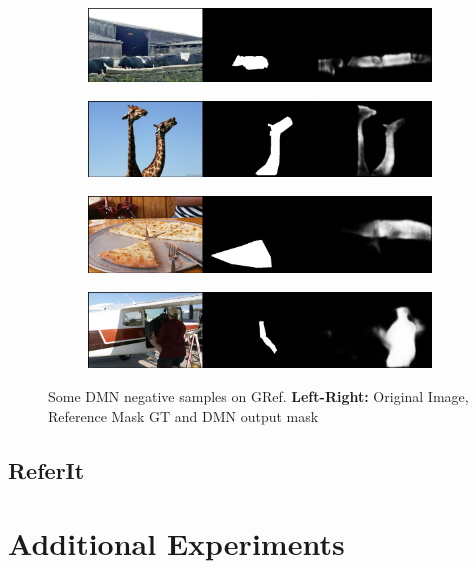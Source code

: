 \begin{figure}[!htbp]
    \centering
    \begin{subfigure}[b]{\columnwidth}
            \centering
            \includegraphics[width=\textwidth]{./figures/gref_samples/1_neg.png}
    \end{subfigure}
    
    \begin{subfigure}[b]{\columnwidth}
            \centering
            \includegraphics[width=\textwidth]{./figures/gref_samples/2_neg.png}
    \end{subfigure}
    
    \begin{subfigure}[b]{\columnwidth}
            \centering
            \includegraphics[width=\textwidth]{./figures/gref_samples/3_neg.png}
    \end{subfigure}
    
    \begin{subfigure}[b]{\columnwidth}
            \centering
            \includegraphics[width=\textwidth]{./figures/gref_samples/4_neg.png}
    \end{subfigure}
    \caption{Some DMN negative samples on GRef. \textbf{Left-Right:} Original Image, Reference Mask GT and DMN output mask}
    \label{Fig:GRef_Neg}
\end{figure}
\FloatBarrier
\subsection*{ReferIt}

\section{Additional Experiments}